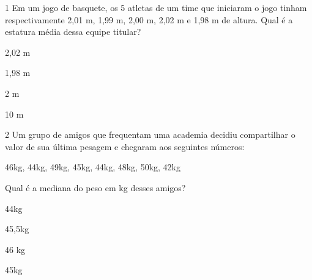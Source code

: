 \num{1} Em um jogo de basquete, os 5 atletas de um time que iniciaram o jogo
tinham respectivamente 2,01 m, 1,99 m, 2,00 m, 2,02 m e 1,98 m de
altura. Qual é a estatura média dessa equipe titular?
\item 2,02 m
\item 1,98 m
\item 2 m
\item 10 m











\num{2} Um grupo de amigos que frequentam uma academia decidiu compartilhar o
valor de sua última pesagem e chegaram aos seguintes números:

46kg, 44kg, 49kg, 45kg, 44kg, 48kg, 50kg, 42kg

Qual é a mediana do peso em kg desses amigos?
\item 44kg
\item 45,5kg
\item 46 kg
\item 45kg




